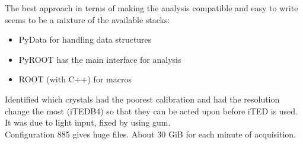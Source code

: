\begin{minipage}[t][0.2\textheight][t]{0.97\linewidth}
    The best approach in terms of making the analysis compatible and easy to write seems to be a mixture of the available stacks:
    \begin{itemize}
      \item PyData for handling data structures
      \item PyROOT has the main interface for analysis
      \item ROOT (with C++) for macros
    \end{itemize}
    Identified which crystals had the poorest calibration and had the resolution change the most (iTEDB4) so that they can be acted upon before iTED is used. It was due to light input, fixed by using gum.\\
    Configuration 885 gives huge files. About 30 GiB for each minute of acquisition.
\end{minipage}

\newpage